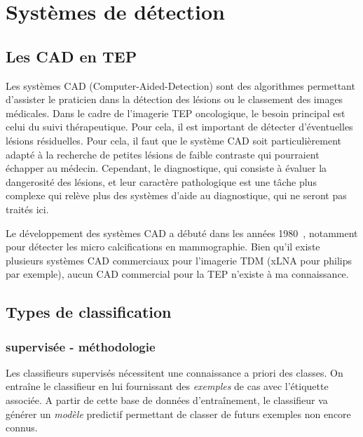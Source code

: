 \chapter{Systèmes de détection}

	\section{Les CAD en TEP}

Les systèmes CAD (Computer-Aided-Detection) sont des algorithmes permettant d'assister le praticien dans la détection des lésions ou le classement des images médicales. Dans le cadre de l'imagerie TEP oncologique, le besoin principal est celui du suivi thérapeutique. Pour cela, il est important de détecter d'éventuelles lésions résiduelles. Pour cela, il faut que le système CAD soit particulièrement adapté à la recherche de petites lésions de faible contraste qui pourraient échapper au médecin. Cependant, le diagnostique, qui consiste à évaluer la dangerosité des lésions, et leur caractère pathologique est une tâche plus complexe qui relève plus des systèmes d'aide au diagnostique, qui ne seront pas traités ici.

Le développement des systèmes CAD a débuté dans les années 1980~\cite{chan1987image}, notamment pour détecter les micro calcifications en mammographie. Bien qu'il existe plusieurs systèmes CAD commerciaux pour l'imagerie TDM (xLNA pour philips par exemple), aucun CAD commercial pour la TEP n'existe à ma connaissance.

	\section{Types de classification}
		\subsection{supervisée - méthodologie}

Les classifieurs supervisés nécessitent une connaissance a priori des classes. On entraîne le classifieur en lui fournissant des \emph{exemples} de cas avec l'étiquette associée. A partir de cette base de données d'entraînement, le classifieur va générer un \emph{modèle} predictif permettant de classer de futurs exemples non encore connus.

